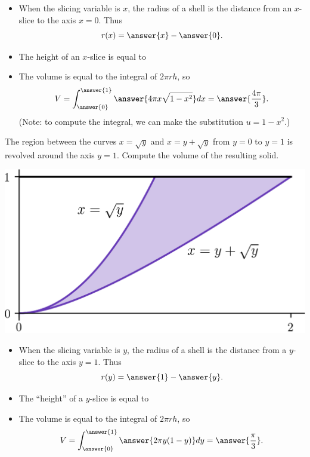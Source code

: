 \documentclass{ximera}
\begin{document}
\begin{example}
\begin{itemize}
\item When the slicing variable is $x$, the radius of a shell is the  distance from an $x$-slice to the axis $x = 0$. Thus
\[ r(x) = \answer{x} - \answer{0}. \]
\item The height of an $x$-slice is equal to
\begin{multipleChoice}
\end{multipleChoice}
\item The volume is equal to the integral of $2 \pi r h$, so 
\[ V = \int_{\answer{0}}^{\answer{1}} \answer{4 \pi x \sqrt{1-x^2}} dx = \answer{\frac{4\pi}{3}}. \]
(Note: to compute the integral, we can make the substitution $u = 1-x^2$.)
\end{itemize}
\end{example}

\begin{example}
The region between the curves $x = \sqrt{y}$ and $x = y + \sqrt{y}$ from $y=0$ to $y=1$ is revolved around the axis $y=1$. Compute the volume of the resulting solid.
\begin{center}
\begin{image}
\includegraphics{shell/shell02.png}
\end{image}
\end{center}
\begin{itemize}
\item When the slicing variable is $y$, the radius of a shell is the  distance from a $y$-slice to the axis $y = 1$. Thus
\[ r(y) = \answer{1} - \answer{y}. \]
\item The ``height'' of a $y$-slice is equal to
\begin{multipleChoice}
\end{multipleChoice}
\item The volume is equal to the integral of $2 \pi r h$, so 
\[ V = \int_{\answer{0}}^{\answer{1}} \answer{2 \pi y(1-y)} dy = \answer{\frac{\pi}{3}}. \]
\end{itemize}
\end{example}
\end{document}
